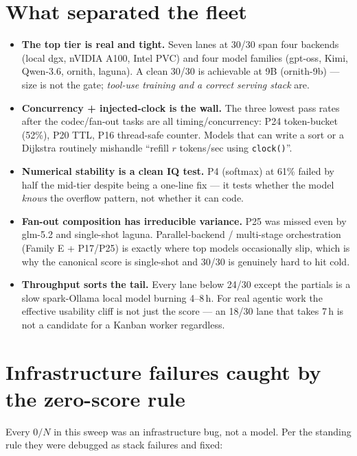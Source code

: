 \documentclass[11pt]{article}
\begin{document}
\section{What separated the fleet}

\begin{itemize}
\item \textbf{The top tier is real and tight.} Seven lanes at 30/30 span four
  backends (local dgx, nVIDIA A100, Intel PVC) and four model families (gpt-oss, Kimi, Qwen-3.6,
  ornith, laguna). A clean 30/30 is achievable at 9B (ornith-9b) --- size is not the
  gate; \emph{tool-use training and a correct serving stack} are.
\item \textbf{Concurrency + injected-clock is the wall.} The three lowest pass rates
  after the codec/fan-out tasks are all timing/concurrency: P24 token-bucket (52\%),
  P20 TTL, P16 thread-safe counter. Models that can write a sort or a Dijkstra
  routinely mishandle ``refill $r$ tokens/sec using \texttt{clock()}''.
\item \textbf{Numerical stability is a clean IQ test.} P4 (softmax) at 61\% failed by
  half the mid-tier despite being a one-line fix --- it tests whether the model
  \emph{knows} the overflow pattern, not whether it can code.
\item \textbf{Fan-out composition has irreducible variance.} P25 was missed even by
  glm-5.2 and single-shot laguna. Parallel-backend / multi-stage orchestration
  (Family E + P17/P25) is exactly where top models occasionally slip, which is why
  the canonical score is single-shot and 30/30 is genuinely hard to hit cold.
\item \textbf{Throughput sorts the tail.} Every lane below 24/30 except the partials
  is a slow spark-Ollama local model burning 4--8\,h. For real agentic work the
  effective usability cliff is not just the score --- an 18/30 lane that takes 7\,h is
  not a candidate for a Kanban worker regardless.
\end{itemize}

\section{Infrastructure failures caught by the zero-score rule}

Every $0/N$ in this sweep was an infrastructure bug, not a model. Per the standing
rule they were debugged as stack failures and fixed:
\end{document}

